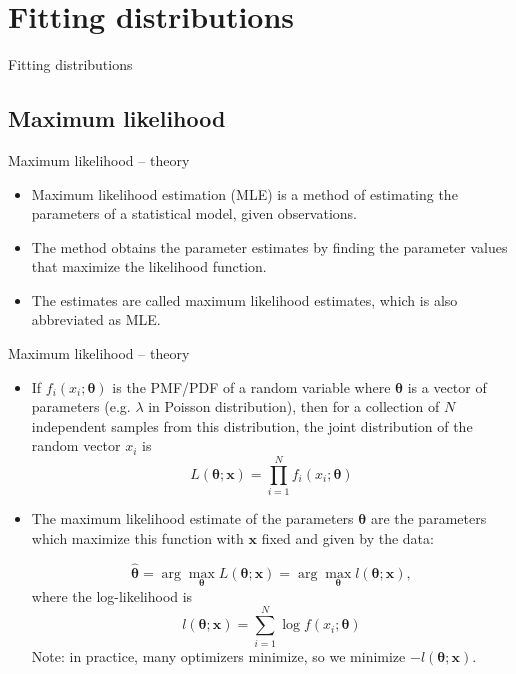 \documentclass[10pt,ignorenonframetext,aspectratio=169]{beamer}
\begin{document}
\section{Fitting distributions}

\begin{frame}{}
\begin{center}
    \Large{Fitting distributions}
\end{center}    
\end{frame}

\subsection{Maximum likelihood}

\begin{frame}{Maximum likelihood -- theory}
    \begin{itemize}
        \item Maximum likelihood estimation (MLE) is a method of estimating the parameters of a statistical model, given observations.
        \item The method obtains the parameter estimates by finding the parameter values that maximize the likelihood function. 
        \item The estimates are called maximum likelihood estimates, which is also abbreviated as MLE.
        
    \end{itemize}
\end{frame}

\begin{frame}{Maximum likelihood -- theory}
\begin{itemize}
    \item If $f_{i}\left(x_{i} ; \boldsymbol{\theta}\right)$ is the PMF/PDF of a random variable where  $\boldsymbol{\theta}$ is a vector of parameters (e.g. $\lambda$ in Poisson distribution), then for a collection of $N$ independent samples from this distribution, the joint distribution of the random vector $x_i$ is
    \begin{equation}
        L(\boldsymbol{\theta}; \mathbf{x})=\prod_{i=1}^{N} f_{i}\left(x_{i}; \boldsymbol{\theta} \right)
    \end{equation}
\item The maximum likelihood estimate of the parameters  $\boldsymbol{\theta}$ are the parameters which maximize this function with $\boldsymbol{x}$ fixed and given by the data:

\begin{equation}
    \hat{\boldsymbol{\theta}} =\arg \max _{\boldsymbol{\theta}} L(\boldsymbol{\theta}; \mathbf{x} ) =\arg \max _{\boldsymbol{\theta}} l(\boldsymbol{\theta}; \mathbf{x}),
\end{equation}
where the log-likelihood is
\begin{equation}
    l(\boldsymbol{\theta}; \mathbf{x}) = \sum_{i=1}^{N} \log f\left(x_{i}; \boldsymbol{\theta} \right)
\end{equation}
Note: in practice, many optimizers minimize, so we minimize $-l(\boldsymbol{\theta}; \mathbf{x})$.
\end{itemize}
    
\end{frame}
\end{document}
